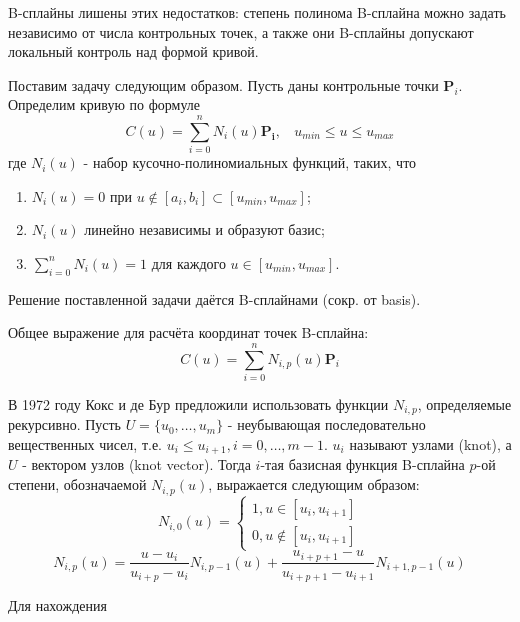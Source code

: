 \documentclass{bmstu}
\begin{document}
B-сплайны лишены этих недостатков: степень полинома B-сплайна можно задать независимо от числа контрольных точек, а также они B-сплайны допускают локальный контроль над формой кривой.

Поставим задачу следующим образом. Пусть даны контрольные точки $\mathbf{P}_i$. Определим кривую по формуле
\begin{equation}
    C(u) = \sum\limits_{i=0}^{n}N_i(u)\mathbf{P_i},~~~~u_{min}\le u \le u_{max}
\end{equation}
где $N_i(u)$ - набор кусочно-полиномиальных функций, таких, что
\begin{enumerate}
    \item $N_i(u) = 0$ при $u\notin[a_i, b_i]\subset[u_{min}, u_{max}]$;
    \item $N_i(u)$ линейно независимы и образуют базис;
    \item $\sum\limits_{i=0}^nN_i(u) = 1$ для каждого $u\in[u_{min}, u_{max}]$.
\end{enumerate}

Решение поставленной задачи даётся B-сплайнами (сокр. от basis).

Общее выражение для расчёта координат точек B-сплайна:
\begin{equation}
    C(u) = \sum\limits_{i=0}^nN_{i,p}(u)\mathbf{P}_i
\end{equation}

В 1972 году Кокс и де Бур предложили использовать функции $N_{i, p}$, определяемые рекурсивно. Пусть $U=\{u_0,\dots,u_m\}$ - неубывающая последовательно  вещественных чисел, т.е. $u_i\le u_{i+1}, i=0,\dots,m-1$. $u_i$ называют узлами (knot), а $U$ - вектором узлов (knot vector). Тогда $i$-тая базисная функция B-сплайна $p$-ой степени, обозначаемой $N_{i,p}(u)$, выражается следующим образом:
\begin{equation}
    N_{i, 0}(u) = \begin{cases}
        1, u\in[u_{i}, u_{i+1}] \\
        0, u\notin[u_{i}, u_{i+1}]
    \end{cases}
\end{equation}
\begin{equation}
    N_{i, p}(u) = \frac{u-u_i}{u_{i+p}-u_i}N_{i, p-1}(u)+\frac{u_{i+p+1}-u}{u_{i+p+1}-u_{i+1}}N_{i+1, p-1}(u)
\end{equation}

Для нахождения
\end{document}
